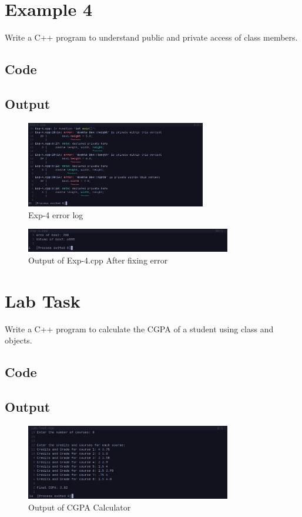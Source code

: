 \documentclass[12pt]{article}
\begin{document}
\FloatBarrier
\section*{Example 4}
Write a C++ program to understand public and private access of class members.

\subsection*{Code}


\subsection*{Output}
\begin{figure}[htpb]
    \centering
    \includegraphics[width=0.7\textwidth]{Exp-4-Error.png}
    \caption{Exp-4 error log}
\end{figure}
\begin{figure}[htpb]
    \centering
    \includegraphics[width=0.8\textwidth]{Exp-4-Error-fixed.png}
    \caption{Output of Exp-4.cpp After fixing error}
\end{figure}


\FloatBarrier
\section*{Lab Task}
Write a C++ program to calculate the CGPA of a student using class and objects.

\subsection*{Code}


\subsection*{Output}
\begin{figure}[htpb]
    \centering
    \includegraphics[width=0.8\textwidth]{Lab-Test.png}
    \caption{Output of CGPA Calculator}
\end{figure}
\end{document}
